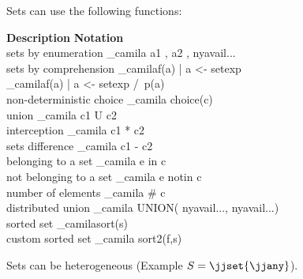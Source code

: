 \documentclass[english,a4paper]{article}
\begin{document}
Sets can use the following functions:

\begin{framed}
\noindent \textbf{Description}  \hfill  \textbf{Notation} \ \  \\
 sets by enumeration          \dotfill \_camila{ { a1 , a2 , nyavail{...}} } \\
 sets by comprehension        \dotfill \_camila{ {f(a)  | a <- setexp}} \\
                        \mbox{} \hfill \_camila{ {f(a)  | a <- setexp /\ p(a)}} \\
 non-deterministic choice     \dotfill \_camila{ choice(c) } \\
 union                        \dotfill \_camila{ c1 U c2 } \\
 interception                 \dotfill \_camila{ c1 * c2 } \\
 sets difference              \dotfill \_camila{ c1 - c2 } \\
 belonging to a set           \dotfill \_camila{ e in c } \\
 not belonging to a set       \dotfill  \_camila{ e notin c } \\
 number of elements           \dotfill  \_camila{ # c } \\
 distributed union            \dotfill \_camila{ UNION( { {nyavail{...}}, nyavail{...}}) } \\
 sorted set                   \dotfill \_camila{sort(s)} \\
 custom sorted set            \dotfill \_camila{ sort2(f,s)}
\end{framed}

Sets can be heterogeneous (Example $S=\jjset{\jjany}$).
\end{document}
